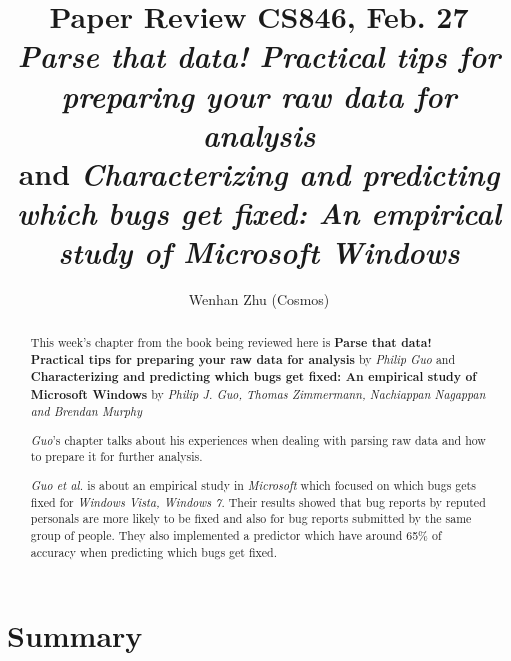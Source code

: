 \documentclass[sigconf]{acmart}
\begin{document}
\title{Paper Review CS846, Feb. 27\\
{\it Parse that data! Practical tips for preparing your raw data for analysis} \\
and {\it Characterizing and predicting which bugs get fixed: An empirical study of Microsoft Windows}
}

\author{Wenhan Zhu (Cosmos)}

\begin{abstract}

    This week's chapter from the book being reviewed here is {\bf Parse that data! Practical tips for preparing your raw data for analysis} by {\it Philip Guo} and {\bf Characterizing and predicting which bugs get fixed: An empirical study of Microsoft Windows} by {\it Philip J. Guo, Thomas Zimmermann, Nachiappan Nagappan and Brendan Murphy}

    {\it Guo}'s chapter talks about his experiences when dealing with parsing raw data and how to prepare it for further analysis.

    {\it Guo et al.} is about an empirical study in {\it Microsoft} which focused on which bugs gets fixed for {\it Windows Vista, Windows 7}. Their results showed that bug reports by reputed personals are more likely to be fixed and also for bug reports submitted by the same group of people. They also implemented a predictor which have around 65\% of accuracy when predicting which bugs get fixed.  

\end{abstract}


\maketitle

\section{Summary}
\end{document}
